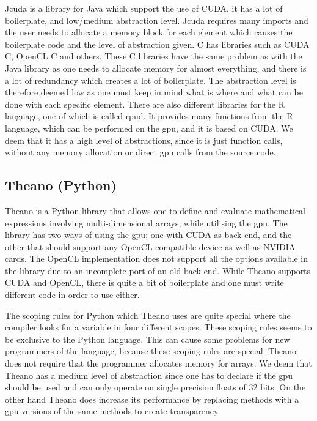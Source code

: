 Jcuda is a library for Java which support the use of CUDA, it has a lot of boilerplate, and low/medium abstraction level. \citep{Java_library}
Jcuda requires many imports and the user needs to allocate a memory block for each element which causes the boilerplate code and the level of abstraction given. \citep{Java_malloc}
C has libraries such as CUDA C, OpenCL C and others.
These C libraries have the same problem as with the Java library as one needs to allocate memory for almost everything, and there is a lot of redundancy which creates a lot of boilerplate. 
The abstraction level is therefore deemed low as one must keep in mind what is where and what can be done with each specific element. \citep{C_CUDA} 
There are also different libraries for the R language, one of which is called rpud.
It provides many functions from the R language, which can be performed on the \acrshort{gpu}, and it is based on CUDA.
We deem that it has a high level of abstractions, since it is just function calls, without any memory allocation or direct \acrshort{gpu} calls from the source code. \citep{Rcuda} 

\subsection{Theano (Python)}
Theano is a Python library that allows one to define and evaluate mathematical expressions involving multi-dimensional arrays, while utilising the \acrshort{gpu}.
The library has two ways of using the \acrshort{gpu}; one with CUDA as back-end, and the other that should support any OpenCL compatible device as well as NVIDIA cards.
The OpenCL implementation does not support all the options available in the library due to an incomplete port of an old back-end.
While Theano supports CUDA and OpenCL, there is quite a bit of boilerplate and one must write different code in order to use either.

The scoping rules for Python which Theano uses are quite special where the compiler looks for a variable in four different scopes.
These scoping rules seems to be exclusive to the Python language. 
This can cause some problems for new programmers of the language, because these scoping rules are special. 
Theano does not require that the programmer allocates memory for arrays.
We deem that Theano has a medium level of abstraction since one has to declare if the \acrshort{gpu} should be used and can only operate on single precision floats of 32 bits.
On the other hand Theano does increase its performance by replacing methods with a \acrshort{gpu} versions of the same methods to create transparency. \citep{Theano,Theano_GPU,bergstratheano, LEGB}

